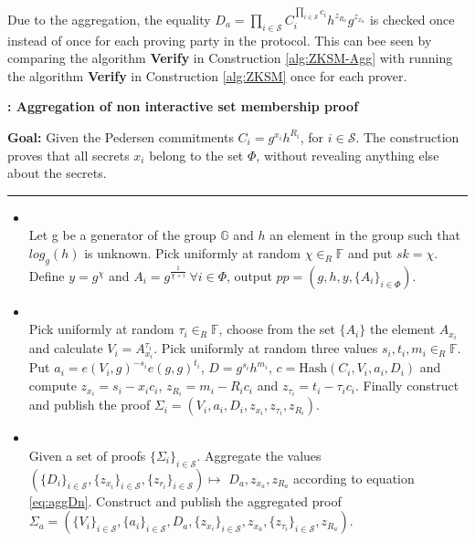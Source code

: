 Due to the aggregation, the equality $D_a=\prod_{i\in\mathcal{S}}C_i^{\prod_{i\in\mathcal{S}}c_i}h^{z_{R_a}}g^{z_{x_a}}$ is checked once instead of once for each proving party in the protocol. This can bee seen by comparing the algorithm \textbf{Verify} in Construction \ref{alg:ZKSM-Agg} with running the algorithm \textbf{Verify} in Construction \ref{alg:ZKSM} once for each prover. 

\begin{algorithm}[]
\caption{\textbf{: Aggregation of non interactive set membership proof}}
\textbf{Goal:}  Given the Pedersen commitments $C_i=g^{x_i} h^{R_i}$, for $i\in\mathcal{S}$. The construction  proves that all secrets $x_i$ belong to the set $\Phi$, without revealing anything else about the secrets.
\vspace{3pt}\hrule\vspace{2pt}
\begin{itemize}
  \item{}\\
 Let g be a generator of the group $\mathds{G}$ and $h$ an element in the group such that $log_g(h)$ is unknown.  
Pick uniformly at random $\chi\in_R\mathds{F}$ and put $sk=\chi$. Define $y=g^\chi$ and $A_i=g^{\frac{1}{\chi+i}} \:\forall i\in\Phi$, output $pp=(g,h,y,\{A_i\}_{i\in\Phi})$.

\item{}\\
Pick uniformly at random $\tau_i\in_R\mathds{F}$, choose from the set $\{A_i\}$ the element $A_{x_i}$ and calculate $V_i=A_{x_i}^{\tau_i}$. Pick uniformly at random three values $s_i,t_i,m_i\in_R\mathds{F}$. Put $a_i=e(V_i,g)^{-s_i}e(g,g)^{t_i}$,  $D=g^{s_i}h^{m_i}$, $c=\text{Hash}(C_i,V_i,a_i,D_i)$ and compute $z_{x_i} = s_i-x_i c_i$, $z_{R_i} = m_i-R_ic_i$ and $z_{\tau_i}= t_i-\tau_i c_i$.  Finally construct and publish the proof $\Sigma_i = (V_i,a_i,D_i,z_{x_i},z_{\tau_i},z_{R_i})$.

\item {} \\
Given a set of proofs  $\{\Sigma_i\}_{i\in\mathcal{S}}$. Aggregate the values $( \{D_i \}_{i\in\mathcal{S} }, \{ z_{x_i}\}_{i\in\mathcal{S} }, \{ z_{r_i}\}_{i\in\mathcal{S}  }) \mapsto$ $ D_a,z_{x_a},z_{R_a}$ according to equation \eqref{eq:aggDn}. Construct and publish the aggregated proof $\Sigma_a = (\{V_i\}_{i\in\mathcal{S} },\{a_i\}_{i\in\mathcal{S} },D_a,\{z_{x_i}\}_{i\in\mathcal{S} }, z_{x_a}, \{z_{\tau_i}\}_{i\in\mathcal{S} },z_{R_a})$.


\end{itemize}
\end{algorithm}
